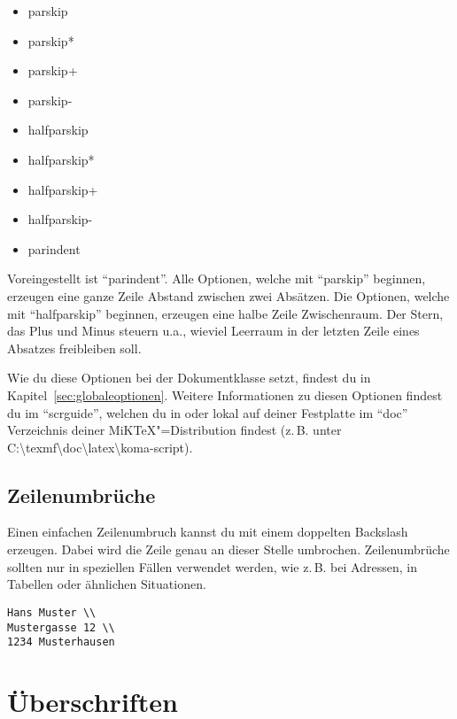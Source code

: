 \begin{itemize}
	\item parskip
	\item parskip*
	\item parskip+
	\item parskip-
	\item halfparskip
	\item halfparskip*
	\item halfparskip+
	\item halfparskip-
	\item parindent
\end{itemize}

Voreingestellt ist \enquote{parindent}. Alle Optionen, welche mit \enquote{parskip} beginnen, erzeugen eine ganze Zeile Abstand zwischen zwei Absätzen. Die Optionen, welche mit \enquote{halfparskip} beginnen, erzeugen eine halbe Zeile Zwischenraum. Der Stern, das Plus und Minus steuern u.a., wieviel Leerraum in der letzten Zeile eines Absatzes freibleiben soll.

Wie du diese Optionen bei der Dokumentklasse setzt, findest du in Kapitel~\ref{sec:globaleoptionen}. Weitere Informationen zu diesen Optionen findest du im \enquote{scrguide}, welchen du in \cite{KOMA} oder lokal auf deiner Festplatte im \enquote{doc} Verzeichnis deiner MiKTeX"=Distribution findest (z.\,B. unter C:\textbackslash texmf\textbackslash doc\textbackslash latex\textbackslash koma-script).

\subsection{Zeilenumbrüche}

Einen einfachen Zeilenumbruch kannst du mit einem doppelten Backslash erzeugen. Dabei wird die Zeile genau an dieser Stelle umbrochen. Zeilenumbrüche sollten nur in speziellen Fällen verwendet werden, wie z.\,B. bei Adressen, in Tabellen oder ähnlichen Situationen.

\begin{lstlisting}
Hans Muster \\
Mustergasse 12 \\
1234 Musterhausen
\end{lstlisting}

\section{Überschriften}

